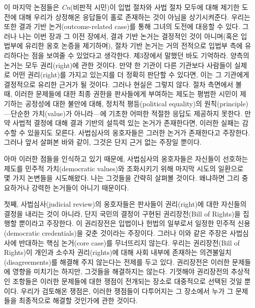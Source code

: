 \documentclass[a4paper,12pt,oneside]{article}  %
\begin{document}
이 마지막 논점들은 \emph{Cn}(비판적 시민)이 입법 절차와 사법 절차 모두에 대해
제기한 도전에 대해 우리가 상정해온 응답들이 홀로 존재하는 것이 아님을
상기시켜준다. 우리는 또한 결과 기반 논거(outcome-related case)를 통해
그녀의 도전에 대응할 수 있다. 그러나 나는 이번 장과 그 이전 장에서, 결과
기반 논거는 결정적인 것이 아니며(혹은 입법부에 유리한 옹호 논증을
제기하며), 절차 기반 논거는 거의 전적으로 입법부 측에 유리하다는 점을
보여줄 수 있었다고 생각한다. 제3장에서 말했던 바도 기억하라. 양측의
논거는 모두 권리(right)에 관한 것이다. 만약 한 기관이 다른 기관보다
사람들이 실제로 어떤 권리(right)를 가지고 있는지를 더 정확히 판단할 수
있다면, 이는 그 기관에게 결정적으로 유리한 근거가 될 것이다. 그러나
현실은 그렇지 않다. 절차 측면에서 볼 때, 이러한 문제들에 대한 최종
권한을 판사들에게 부여하는 제도는 평범한 시민이 제기하는 공정성에 대한
불만에 대해, 정치적 평등(political equality)의 원칙(principle)---단순한
가치(value)가 아니라---에 기초한 어떠한 적절한 응답도 제공하지 못한다.
만약 사법적 결정에 대해 결과 기반의 설득력 있는 논거가 존재한다면,
이러한 실패는 감수할 수 있을지도 모른다. 사법심사의 옹호자들은 그러한
논거가 존재한다고 주장한다. 그러나 앞서 살펴본 바와 같이, 그것은 단지
근거 없는 주장일 뿐이다.

아마 이러한 점들을 인식하고 있기 때문에, 사법심사의 옹호자들은 자신들이
선호하는 제도를 민주적 가치(democratic values)와 조화시키기 위해 마지막
시도의 일환으로 몇 가지 논변들을 시도해왔다. 나는 그것들을 간략히 살펴볼
것이다. 왜냐하면 그리 중요하거나 강력한 논거들이 아니기 때문이다.

첫째, 사법심사(judicial review)의 옹호자들은 판사들이 권리(right)에 대한
자신들의 결정을 내리는 것이 아니라, 단지 국민의 결정이 구현된
권리장전(Bill of Rights)을 집행할 뿐이라고 주장한다. 이 권리장전은
입법이나 헌법의 일부로서 일정한 민주적 신용(democratic credentials)을
갖춘 것이라는 주장이다. 그러나 이와 같은 주장은 사법심사에 반대하는 핵심
논거(core case)를 무너뜨리지 않는다. 우리는 권리장전(Bill of Rights)이
개인과 소수자 권리(rights)에 대해 사회 내부에 존재하는
의견불일치(disagreements)를 해결해 주지 않는다는 전제를 두고 있다.
권리장전은 이러한 문제들에 영향을 미치기는 하지만, 그것들을 해결하지는
않는다. 기껏해야 권리장전의 추상적인 조항들은 이러한 문제들에 대한
쟁점이 전개되는 장소로 대중적으로 선택된 것일 뿐이다. 우리가 검토해온
쟁점은, 이러한 쟁점들이 다투어지는 그 장소에서 누가 그 문제들을
최종적으로 해결할 것인가에 관한 것이다.
\end{document}
